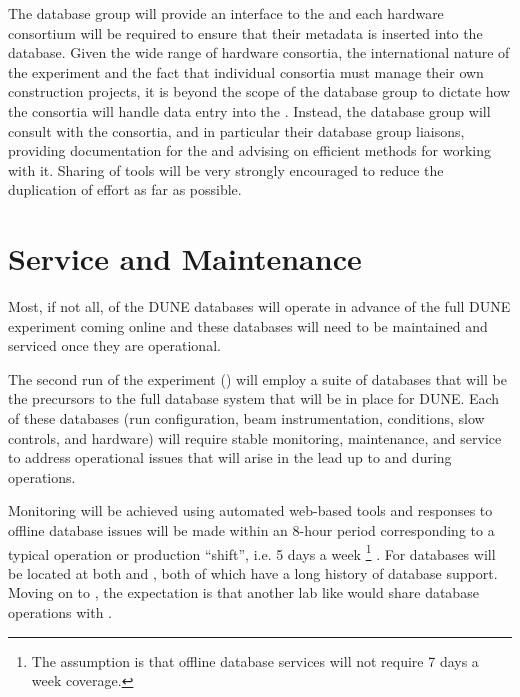 \documentclass[../main-v1.tex]{subfiles}
\begin{document}
The database group will provide an interface to the  and each hardware consortium will be required to ensure that their metadata is inserted into the database. Given the wide range of hardware consortia, the international nature of the experiment and the fact that individual consortia must manage their own construction projects, it is 
beyond the scope of the database group to dictate how the consortia will handle data entry into the .  Instead, the database group will consult with the consortia, and in particular their database group liaisons, providing documentation for the  and advising on efficient methods for working with it.  Sharing of tools will be very strongly encouraged to reduce the duplication of effort as far as possible.


\section{Service and Maintenance  }
\label{sec:db:service}  

Most, if not all, of the DUNE databases will operate in advance of the full DUNE experiment coming online and these databases will need to be maintained and serviced once they are operational. 

The second run of the  experiment () will employ a suite of databases that will be the precursors to the full database system that will be in place for DUNE. Each of these databases (run configuration, beam instrumentation, conditions, slow controls, and hardware) will require stable monitoring, maintenance, and service to address operational issues that will arise in the lead up to and during %
 operations.

Monitoring will be achieved using automated web-based tools  and responses to offline database issues will be made within an 8-hour period corresponding to a typical operation or production ``shift'', i.e. 5 days a week
\footnote{The assumption is that offline database services will not require 7 days a week coverage.}
. For  databases will be located at both  and , both of which have a long history of database support.  Moving on to , the expectation is that another  lab like  would share database operations with .
\end{document}
